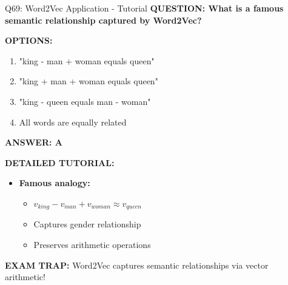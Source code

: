 \documentclass[8pt]{beamer}
\begin{document}
	\begin{frame}{Q69: Word2Vec Application - Tutorial}
		\fontsize{6.5}{7.5}\selectfont
		\textbf{QUESTION: What is a famous semantic relationship captured by Word2Vec?}
		
		\vspace{0.1cm}
		\textbf{OPTIONS:}
		\begin{enumerate}
			\item "king - man + woman equals queen"
			\item "king + man + woman equals queen"
			\item "king - queen equals man - woman"
			\item All words are equally related
		\end{enumerate}
		
		\vspace{0.1cm}
		\textcolor{myblue}{\textbf{ANSWER: A}}
		
		\vspace{0.1cm}
		\textbf{DETAILED TUTORIAL:}
		\begin{itemize}
			\item \textbf{Famous analogy:}
			\begin{itemize}
				\item $v_{king} - v_{man} + v_{woman} \approx v_{queen}$
				\item Captures gender relationship
				\item Preserves arithmetic operations
			\end{itemize}
		\end{itemize}
		
		\textcolor{myred}{\textbf{EXAM TRAP:}} Word2Vec captures \textcolor{myblue}{semantic relationships} via vector arithmetic!
	\end{frame}
	
\end{document}
